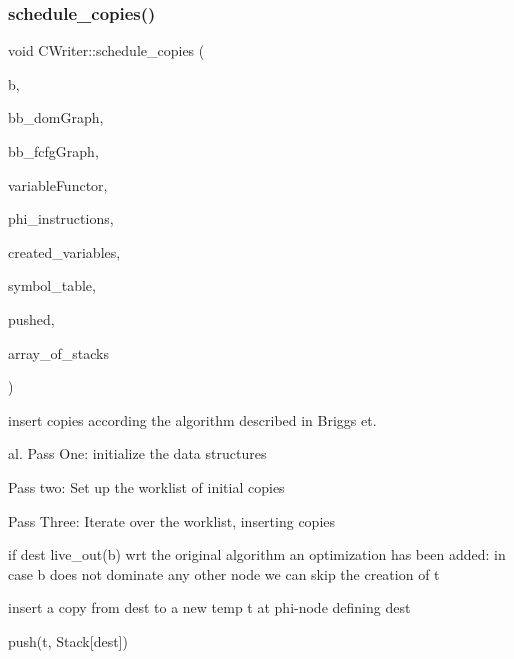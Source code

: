 \subsubsection{\texorpdfstring{schedule\+\_\+copies()}{schedule\_copies()}}
{\footnotesize\ttfamily void C\+Writer\+::schedule\+\_\+copies (\begin{DoxyParamCaption}\item[{\hyperlink{graph_8hpp_abefdcf0544e601805af44eca032cca14}{vertex}}]{b,  }\item[{const \hyperlink{basic__block_8hpp_ab66bdbde3a29e41d079d8a320af9c921}{B\+B\+Graph\+Const\+Ref}}]{bb\+\_\+dom\+Graph,  }\item[{const \hyperlink{basic__block_8hpp_ab66bdbde3a29e41d079d8a320af9c921}{B\+B\+Graph\+Const\+Ref}}]{bb\+\_\+fcfg\+Graph,  }\item[{\hyperlink{var__pp__functor_8hpp_a8a6b51b6519401d911398943510557f0}{var\+\_\+pp\+\_\+functor\+Const\+Ref}}]{variable\+Functor,  }\item[{const \hyperlink{custom__set_8hpp_a615bc2f42fc38a4bb1790d12c759e86f}{Custom\+Set}$<$ unsigned int $>$ \&}]{phi\+\_\+instructions,  }\item[{std\+::map$<$ unsigned int, unsigned int $>$ \&}]{created\+\_\+variables,  }\item[{std\+::map$<$ unsigned int, std\+::string $>$ \&}]{symbol\+\_\+table,  }\item[{std\+::list$<$ unsigned int $>$ \&}]{pushed,  }\item[{std\+::map$<$ unsigned int, std\+::deque$<$ std\+::string $>$$>$ \&}]{array\+\_\+of\+\_\+stacks }\end{DoxyParamCaption})\hspace{0.3cm}{\ttfamily [protected]}}



insert copies according the algorithm described in Briggs et. 

al. Pass One\+: initialize the data structures

Pass two\+: Set up the worklist of initial copies

Pass Three\+: Iterate over the worklist, inserting copies

if dest  live\+\_\+out(b) wrt the original algorithm an optimization has been added\+: in case b does not dominate any other node we can skip the creation of t

insert a copy from dest to a new temp t at phi-\/node defining dest

push(t, Stack\mbox{[}dest\mbox{]})

